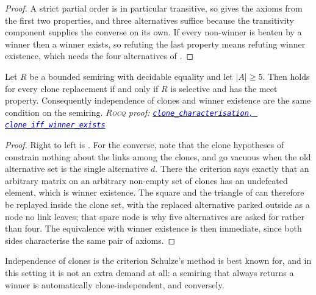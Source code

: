 \documentclass[a4paper,UKenglish,cleveref,autoref,thm-restate,anonymous]{lipics-v2021}
\newcommand{\rocq}{\textsc{Rocq}}
\newcommand{\anonrepo}{https://anonymous.4open.science/r/Semiring_graph_algorithm-000E}
\newcommand{\rocqfile}[2]{\href{\anonrepo/#1}{\textcolor{blue}{\texttt{#2}}}}
\newcommand{\proofat}[2]{{\footnotesize\itshape\rocq{} proof: \rocqfile{#1}{#2}}}
\begin{document}
\begin{proof}
A strict partial order is in particular transitive, so
 gives the axioms from the first two
properties, and three alternatives suffice because the transitivity
component supplies the converse on its own. If every non-winner is beaten
by a winner then a winner exists, so refuting the last property means
refuting winner existence, which needs the four alternatives of
.
\end{proof}

\begin{theorem}\label{thm:clonechar}
Let $R$ be a bounded semiring with decidable equality and let $|A| \geq 5$.
Then  holds for every clone replacement if and only if $R$
is selective and has the meet property. Consequently independence of clones
and winner existence are the same condition on the semiring.
\proofat{algorithm/CloneCharacterisationN.v}{clone\_characterisation, clone\_iff\_winner\_exists}
\end{theorem}

\begin{proof}
Right to left is . For the converse, note that the clone
hypotheses of  constrain nothing about the links among the
clones, and go vacuous when the old alternative set is the single
alternative $d$. There the criterion says exactly that an arbitrary matrix
on an arbitrary non-empty set of clones has an undefeated element, which is
winner existence. The square and the triangle of  can
therefore be replayed inside the clone set, with the replaced alternative
parked outside as a node no link leaves; that spare node is why five
alternatives are asked for rather than four. The equivalence with winner
existence is then immediate, since both sides characterise the same pair of
axioms.
\end{proof}

Independence of clones is the criterion Schulze's method is best known
for, and in this setting it is not an extra demand at all: a semiring that
always returns a winner is automatically clone-independent, and
conversely.
\end{document}
